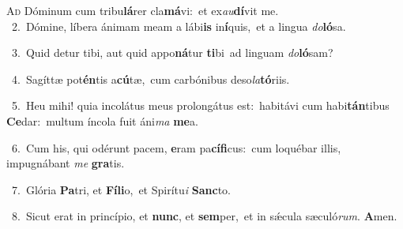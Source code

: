 \lettrine{\initial\textcolor{\initialcolor}{A}}{d} Dóminum cum tribu\-\textbf{lá}\-rer cla\-\textbf{má}\-vi:~\star et ex\-\textit{au}\-\textbf{dí}vit me.\\
{\numbfont\textcolor{\numbcolor}{~2.}}~Dómine, líbera ánimam meam a lábi\textbf{is} in\-\textbf{í}\-quis,~\star et a lingua \textit{do}\-\textbf{ló}sa.\par
{\numbfont\textcolor{\numbcolor}{~3.}}~Quid detur tibi, aut quid appo\-\textbf{ná}\-tur \textbf{ti}\-bi~\star ad linguam \textit{do}\-\textbf{ló}sam?\par
{\numbfont\textcolor{\numbcolor}{~4.}}~Sagíttæ pot\-\textbf{én}\-tis a\-\textbf{cú}\-tæ,~\star cum carbónibus deso\-\textit{la}\-\textbf{tó}riis.\par
{\numbfont\textcolor{\numbcolor}{~5.}}~Heu mihi! quia incolátus meus prolongátus est:~\dagger habitávi cum habi\-\textbf{tán}\-tibus \textbf{Ce}\-dar:~\star multum íncola fuit áni\textit{ma} \textbf{me}\-a.\par
{\numbfont\textcolor{\numbcolor}{~6.}}~Cum his, qui odérunt pacem, \textbf{e}\-ram pa\-\textbf{cí}\-\textbf{fi}cus:~\star cum loquébar illis, impugnábant \textit{me} \textbf{gra}\-tis.\par
{\numbfont\textcolor{\numbcolor}{~7.}}~Glória \textbf{Pa}\-tri, et \textbf{Fí}\-\textbf{li}o,~\star et Spirítu\textit{i} \textbf{Sanc}\-to.\par
{\numbfont\textcolor{\numbcolor}{~8.}}~Sicut erat in princípio, et \textbf{nunc}\-, et \textbf{sem}\-per,~\star et in sǽcula sæculó\-\textit{rum}\-. \textbf{A}\-men.\par
